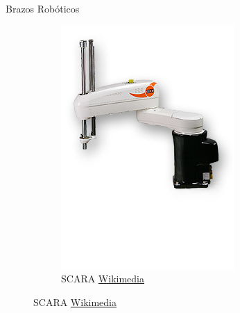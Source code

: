 \begin{frame}[fragile]{Brazos Robóticos}
\begin{figure}
\begin{subfigure}{0.33\textwidth}
		\includegraphics[scale=0.3]{./EtapaModerna/Imagenes/SCARA.jpg}
		\caption{SCARA \href{https://commons.wikimedia.org/wiki/File:KUKA_Industrial_Robot_KR10_SCARA.jpg}{Wikimedia}}
	\end{subfigure}
\end{figure}
\end{frame}


